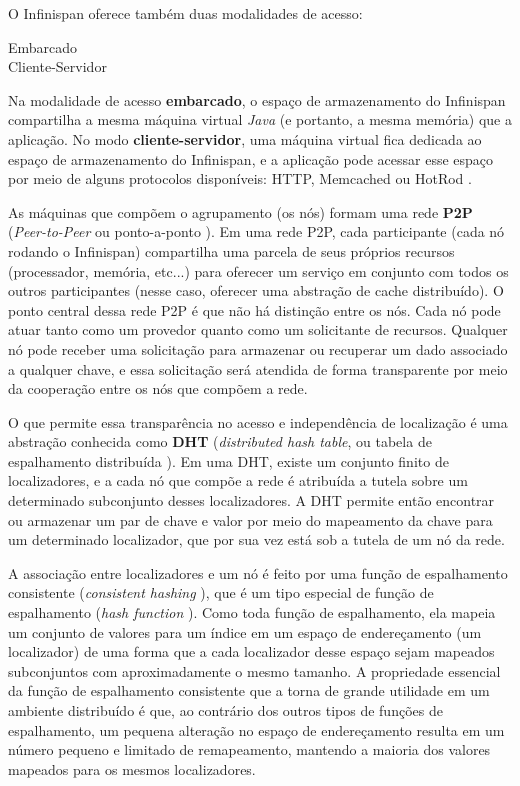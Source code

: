 \documentclass[11pt,twoside,a4paper]{book}
\begin{document}
O Infinispan oferece também duas modalidades de acesso:

\begin{description}
	\item[Embarcado]
	\item[Cliente-Servidor] 
\end{description}

Na modalidade de acesso \textbf{embarcado}, o espaço de armazenamento do Infinispan compartilha a mesma máquina virtual \emph{Java} (e portanto, a mesma memória) que a aplicação. No modo \textbf{cliente-servidor}, uma máquina virtual fica dedicada ao espaço de armazenamento do Infinispan, e a aplicação pode acessar esse espaço por meio de alguns protocolos disponíveis: HTTP, Memcached ou HotRod \cite{infinispan}.

As máquinas que compõem o agrupamento (os nós) formam uma rede \textbf{P2P} (\emph{Peer-to-Peer} ou ponto-a-ponto \cite{p2p}). Em uma rede P2P, cada participante (cada nó rodando o Infinispan) compartilha uma parcela de seus próprios recursos (processador, memória, 
etc...) para oferecer um serviço em conjunto com todos os outros participantes (nesse caso, oferecer uma abstração de cache distribuído).
O ponto central dessa rede P2P é que não há distinção entre os nós. Cada nó pode atuar tanto como um provedor quanto como um solicitante de recursos. Qualquer nó pode receber uma solicitação para armazenar ou recuperar um dado associado a qualquer chave, e essa solicitação será atendida de forma transparente por meio da cooperação entre os nós que compõem a rede.

O que permite essa transparência no acesso e independência de localização é uma abstração conhecida como \textbf{DHT} (\emph{distributed hash table}, ou tabela de espalhamento distribuída \cite{dht}). Em uma DHT, existe um conjunto finito de localizadores, e a cada nó que compõe a rede é atribuída a tutela sobre um determinado subconjunto desses localizadores. A DHT permite então encontrar ou armazenar um par de chave e valor por meio do mapeamento da chave para um determinado localizador, que por sua vez está sob a tutela de um nó da rede.

A associação entre localizadores e um nó é feito por uma função de espalhamento consistente (\emph{consistent hashing} \cite{consistent_hashing}), que é um tipo especial de função de espalhamento (\emph{hash function} \cite{taocp_3}). Como toda função de espalhamento, ela mapeia um conjunto de valores para um índice em um espaço de endereçamento (um localizador) de uma forma que a cada localizador desse espaço sejam mapeados subconjuntos com aproximadamente o mesmo tamanho. A propriedade essencial da função de espalhamento consistente que a torna de grande utilidade em um ambiente distribuído é que, ao contrário dos outros tipos de funções de espalhamento, um pequena alteração no espaço de endereçamento resulta em um número pequeno e limitado de remapeamento, mantendo a maioria dos valores mapeados para os mesmos localizadores.
\end{document}

